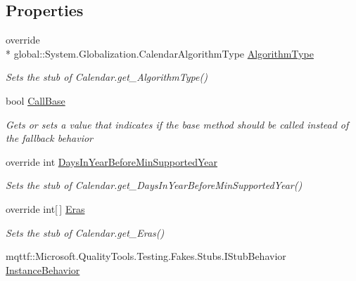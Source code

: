 \subsection*{Properties}
\begin{DoxyCompactItemize}
\item 
override \\*
global\-::\-System.\-Globalization.\-Calendar\-Algorithm\-Type \hyperlink{class_system_1_1_globalization_1_1_fakes_1_1_stub_calendar_a0b7b3e1f0b1b59876f8a3709a3c4c41e}{Algorithm\-Type}
\begin{DoxyCompactList}\small\item\em Sets the stub of Calendar.\-get\-\_\-\-Algorithm\-Type()\end{DoxyCompactList}\item 
bool \hyperlink{class_system_1_1_globalization_1_1_fakes_1_1_stub_calendar_a89b849c020dcb54624e9dee06c363d56}{Call\-Base}
\begin{DoxyCompactList}\small\item\em Gets or sets a value that indicates if the base method should be called instead of the fallback behavior\end{DoxyCompactList}\item 
override int \hyperlink{class_system_1_1_globalization_1_1_fakes_1_1_stub_calendar_abadedc45646c2d8e491c1da3ebb70c10}{Days\-In\-Year\-Before\-Min\-Supported\-Year}
\begin{DoxyCompactList}\small\item\em Sets the stub of Calendar.\-get\-\_\-\-Days\-In\-Year\-Before\-Min\-Supported\-Year()\end{DoxyCompactList}\item 
override int\mbox{[}$\,$\mbox{]} \hyperlink{class_system_1_1_globalization_1_1_fakes_1_1_stub_calendar_a6aded539bda2955264ab1f949040bcea}{Eras}
\begin{DoxyCompactList}\small\item\em Sets the stub of Calendar.\-get\-\_\-\-Eras()\end{DoxyCompactList}\item 
mqttf\-::\-Microsoft.\-Quality\-Tools.\-Testing.\-Fakes.\-Stubs.\-I\-Stub\-Behavior \hyperlink{class_system_1_1_globalization_1_1_fakes_1_1_stub_calendar_a59b9cff3247715c4e4e47c17693c7f06}{Instance\-Behavior}

\end{DoxyCompactItemize}
